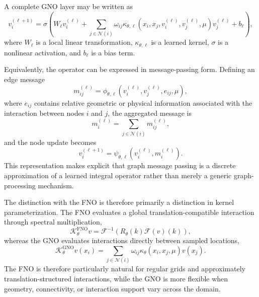 A complete GNO layer may be written as
\begin{equation}
v_i^{(\ell+1)}
=
\sigma
\left(
W_{\ell}v_i^{(\ell)}
+
\sum_{j\in\mathcal{N}(i)}
\omega_{ij}
\kappa_{\theta,\ell}
\left(
x_i,
x_j,
v_i^{(\ell)},
v_j^{(\ell)},
\mu
\right)
v_j^{(\ell)}
+
b_{\ell}
\right),
\label{eq:gno_layer_general}
\end{equation}
where $W_{\ell}$ is a local linear transformation,
$\kappa_{\theta,\ell}$ is a learned kernel,
$\sigma$ is a nonlinear activation,
and $b_{\ell}$ is a bias term.

Equivalently, the operator can be expressed in message-passing form. Defining an edge message
\begin{equation}
m_{ij}^{(\ell)}
=
\phi_{\theta,\ell}
\left(
v_i^{(\ell)},
v_j^{(\ell)},
e_{ij},
\mu
\right),
\label{eq:gno_message}
\end{equation}
where $e_{ij}$ contains relative geometric or physical information associated with the interaction between nodes $i$ and $j$, the aggregated message is
\begin{equation}
m_i^{(\ell)}
=
\sum_{j\in\mathcal{N}(i)}
m_{ij}^{(\ell)},
\label{eq:gno_message_aggregation}
\end{equation}
and the node update becomes
\begin{equation}
v_i^{(\ell+1)}
=
\psi_{\theta,\ell}
\left(
v_i^{(\ell)},
m_i^{(\ell)}
\right).
\label{eq:gno_node_update}
\end{equation}
This representation makes explicit that graph message passing is a discrete approximation of a learned integral operator rather than merely a generic graph-processing mechanism.

The distinction with the FNO is therefore primarily a distinction in kernel parameterization. The FNO evaluates a global translation-compatible interaction through spectral multiplication,
\begin{equation}
\mathcal{K}_{\theta}^{\mathrm{FNO}}v
=
\mathcal{F}^{-1}
\left(
R_{\theta}(k)\mathcal{F}(v)(k)
\right),
\end{equation}
whereas the GNO evaluates interactions directly between sampled locations,
\begin{equation}
\mathcal{K}_{\theta}^{\mathrm{GNO}}v(x_i)
=
\sum_{j\in\mathcal{N}(i)}
\omega_{ij}
\kappa_{\theta}(x_i,x_j,\mu)
v(x_j).
\label{eq:gno_vs_fno}
\end{equation}
The FNO is therefore particularly natural for regular grids and approximately translation-structured interactions, while the GNO is more flexible when geometry, connectivity, or interaction support vary across the domain.

